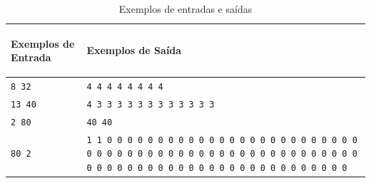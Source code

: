 \begin{table}[h]
    \centering
    \begin{tabular}{|p{7cm}|p{7cm}|}
        \hline
        \begin{center}
            \vspace{-0.3cm}
            \textbf{Exemplos de Entrada}
            \vspace{-0.3cm}
        \end{center} 
         &  
        \begin{center}
            \vspace{-0.3cm}
            \textbf{Exemplos de Saída}
            \vspace{-0.3cm}
        \end{center} \\ \hline
         \texttt{8 32} & \texttt{4 4 4 4 4 4 4 4}  \\ \hline
         \texttt{13 40} & \texttt{4 3 3 3 3 3 3 3 3 3 3 3 3}  \\ \hline
         \texttt{2 80} & \texttt{40 40}  \\ \hline 
         \texttt{80 2} & \texttt{1 1 0 0 0 0 0 0 0 0 0 0 0 0 0 0 0 0 0 0 0 0 0 0 0 0 0 0 0 0 0 0 0 0 0 0 0 0 0 0 0 0 0 0 0 0 0 0 0 0 0 0 0 0 0 0 0 0 0 0 0 0 0 0 0 0 0 0 0 0 0 0 0 0 0 0 0 0 0 0}  \\ \hline
    \end{tabular}
    \caption{Exemplos de entradas e saídas}
    \label{tab:inputO}
\end{table}

\newpage

\begin{center}
\noindent

\end{center}